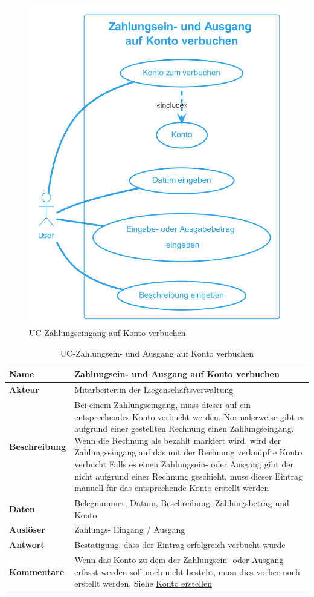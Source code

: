 \newpage
\begin{figure}[H]
  \begin{center}
      \includegraphics[width=0.5\linewidth]{content/diagrams/out/usecase/verbuchenAufKonto/ZahlungseingangaufKontoverbuchen.png}
    \caption{UC-Zahlungseingang auf Konto verbuchen}
  \end{center}
\end{figure}

\begin{table}[H]
  \centering
  \settowidth{}
  \setlength\extrarowheight{2pt}
  \begin{tabulary}{1.0\textwidth}{|a|m{14cm}|}
    \hline
    \textbf{Name}& Zahlungsein- und Ausgang auf Konto verbuchen\\
    \hline
    \textbf{Akteur}& Mitarbeiter:in der Liegenschaftsverwaltung\\
    \hline 
    \textbf{Beschreibung} & Bei einem Zahlungseingang, muss dieser auf ein entsprechendes Konto verbucht werden. Normalerweise gibt es aufgrund einer gestellten Rechnung einen Zahlungseingang. Wenn die Rechnung als bezahlt markiert wird, wird der Zahlungseingang auf das mit der Rechnung verknüpfte Konto verbucht \newline
    Falls es einen Zahlungsein- oder Ausgang gibt der nicht aufgrund einer Rechnung geschieht, muss dieser Eintrag manuell für das entsprechende Konto erstellt werden\\
    \hline
    \textbf{Daten} & Belegnummer, Datum, Beschreibung, Zahlungsbetrag und Konto\\
    \hline
    \textbf{Auslöser} & Zahlungs- Eingang / Ausgang\\
    \hline
    \textbf{Antwort} & Bestätigung, dass der Eintrag erfolgreich verbucht wurde\\
    \hline
    \textbf{Kommentare} & Wenn das Konto zu dem der Zahlungsein- oder Ausgang erfasst werden soll noch nicht besteht, muss dies vorher noch erstellt werden. Siehe \hyperref[kontoErstellen]{Konto erstellen }\\
    \hline
  \end{tabulary}
  \caption{UC-Zahlungsein- und Ausgang auf Konto verbuchen}
\end{table}

